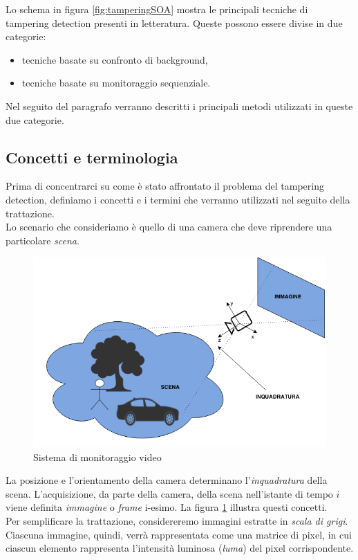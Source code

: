 Lo schema in figura \ref{fig:tamperingSOA} mostra le principali tecniche di tampering detection presenti in letteratura.
Queste possono essere divise in due categorie: 
\begin{itemize}
	\item tecniche basate su confronto di background,
	\item tecniche basate su monitoraggio sequenziale.
\end{itemize}
Nel seguito del paragrafo verranno descritti i principali metodi utilizzati in queste due categorie.
\subsection{Concetti e terminologia}
\label{concetti}
Prima di concentrarci su come \`e stato affrontato il problema del tampering detection, definiamo i concetti e i termini che verranno utilizzati nel seguito della trattazione.\\
Lo scenario che consideriamo \`e quello di una camera che deve riprendere una particolare \textit{\gls{scena}}.
\begin{figure}
	\centering
	\includegraphics[width=12cm]{./pictures/videoMonitoring}
	\caption{Sistema di monitoraggio video}
	\label{fig:videoMonitoring}
\end{figure}
\noindent 
La posizione e l'orientamento della camera determinano l'\textit{\gls{inquadratura}} della scena.
L'acquisizione, da parte della camera, della scena nell'istante di tempo $i$ viene definita \textit{immagine} o \textit{frame} i-esimo.
La figura \ref{fig:videoMonitoring} illustra questi concetti.\\
Per semplificare la trattazione, considereremo immagini estratte in \textit{scala di grigi}.
Ciascuna immagine, quindi, verr\`a rappresentata come una matrice di pixel, in cui ciascun elemento rappresenta l'intensit\`a luminosa (\textit{luma}) del pixel corrispondente.
